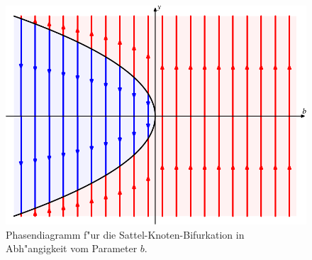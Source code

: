 \begin{figure}
\centering
\includegraphics{chapters/images/bifurkation-1.pdf}
\caption{Phasendiagramm f"ur die Sattel-Knoten-Bifurkation in
Abh"angigkeit vom Parameter $b$.
\label{geometrie:saddle-node}}
\end{figure}

